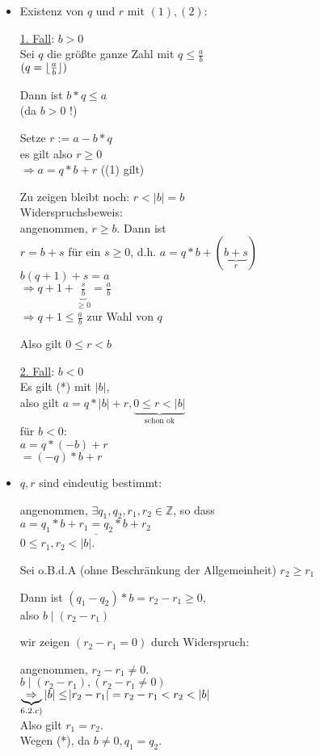 \documentclass[a4paper, 12pt, twoside] {article}
\DeclarePairedDelimiter\floor{\lfloor}{\rfloor}
\begin{document}
\begin{itemize}

\item Existenz von $q$ und $r$ mit $(1), (2)$:

\underline{1. Fall}: $b > 0$ \\
Sei $q$ die größte ganze Zahl mit $q \leq \frac{a}{b}$ \\
$(q = \floor{\frac{a}{b}})$

Dann ist $b*q \leq a$ \\
(da $b > 0$ !)

Setze $r:= a - b*q$ \\
es gilt also $r \geq 0$ \\
$\Rightarrow a = q*b +r$ ((1) gilt) %

Zu zeigen bleibt noch: $r < |b| = b$ \\
Widerspruchsbeweis: \\
angenommen, $r \geq b$. Dann ist \\
$r = b+s$ für ein $s \geq 0$,
d.h. $a = q*b + (\underbrace{b+s}_{r})$ \\
$b(q+1)+s = a$ \\
$\Rightarrow q +1 + \underbrace{\frac{s}{b}}_{\geq 0} = \frac{a}{b}$ \\
$\Rightarrow q + 1 \leq \frac{a}{b}$ zur Wahl von $q \quad$ \Lightning

Also gilt $0 \leq r < b$

\underline{2. Fall}: $b < 0$ \\
Es gilt (*) mit $|b|$, \\ %
also gilt $a = q * |b| + r, \underbrace{0 \leq r < |b|}_{\text{schon ok}}$ \\
für $b < 0$: \\
$a = q*(-b) + r$ \\
$= (-q) * b + r$

\item $q, r$ sind eindeutig bestimmt:

angenommen, $\exists q_1, q_2, r_1, r_2 \in \mathbb{Z}$, so dass \\
$a = \underline{q_1* b + r_1 = q_2*b+r_2}$ \\
$0 \leq r_1, r_2 < |b|$.

Sei o.B.d.A (ohne Beschränkung der Allgemeinheit) $r_2 \geq r_1$

Dann ist $(q_1 - q_2) * b = r_2 - r_1 \geq 0$, \\ %
also $b \mid (r_2-r_1)$

wir zeigen $(r_2-r_1 = 0)$ durch Widerspruch:

angenommen, $r_2-r_1 \neq 0$. \\
$b \mid (r_2-r_1), (r_2-r_1 \neq 0)$ \\
$\underbrace{\Rightarrow}_{6.2.c)} |b| \leq \abs{r_2 - r_1} = r_2 - r_1  < r_2 < |b|$ \\
Also gilt $r_1 = r_2$. \\
Wegen (*), da $b \neq 0, q_1=q_2$. %

\end{itemize}
\end{document}
